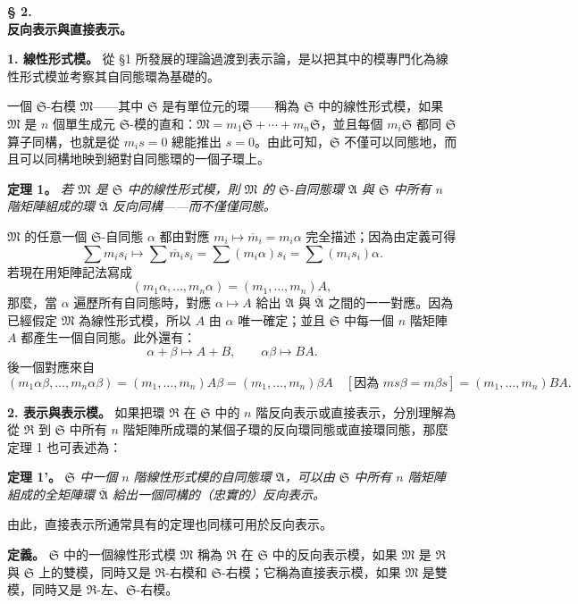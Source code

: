 \documentclass[11pt]{article}
\providecommand{\frR}{\mathfrak R}
\providecommand{\frS}{\mathfrak S}
\providecommand{\frM}{\mathfrak M}
\providecommand{\mA}{\mathfrak A}
\providecommand{\mbarA}{\overline{\mathfrak A}}
\begin{document}
\begin{center}
\textbf{§ 2.}\\[0.4em]
\textbf{反向表示與直接表示。}
\end{center}

\noindent\textbf{1. 線性形式模。} 從 §1 所發展的理論過渡到表示論，是以把其中的模專門化為線性形式模並考察其自同態環為基礎的。

一個 \(\frS\)-右模 \(\frM\)——其中 \(\frS\) 是有單位元的環——稱為 \(\frS\) 中的線性形式模，如果 \(\frM\) 是 \(n\) 個單生成元 \(\frS\)-模的直和：\(\frM=m_1\frS+\cdots+m_n\frS\)，並且每個 \(m_i\frS\) 都同 \(\frS\) 算子同構，也就是從 \(m_i s=0\) 總能推出 \(s=0\)。由此可知，\(\frS\) 不僅可以同態地，而且可以同構地映到絕對自同態環的一個子環上。

\noindent\textbf{定理 1。} \emph{若 \(\frM\) 是 \(\frS\) 中的線性形式模，則 \(\frM\) 的 \(\frS\)-自同態環 \(\mA\) 與 \(\frS\) 中所有 \(n\) 階矩陣組成的環 \(\mbarA\) 反向同構——而不僅僅同態。}

\(\frM\) 的任意一個 \(\frS\)-自同態 \(\alpha\) 都由對應 \(m_i\longmapsto \overline m_i=m_i\alpha\) 完全描述；因為由定義可得
\[
        \sum m_i s_i\longmapsto
        \sum \overline m_i s_i
        =\sum (m_i\alpha)s_i
        =\sum (m_i s_i)\alpha.
\]
若現在用矩陣記法寫成
\[
        (m_1\alpha,\ldots,m_n\alpha)=(m_1,\ldots,m_n)A,
\]
那麼，當 \(\alpha\) 遍歷所有自同態時，對應 \(\alpha\mapsto A\) 給出 \(\mA\) 與 \(\mbarA\) 之間的一一對應。因為已經假定 \(\frM\) 為線性形式模，所以 \(A\) 由 \(\alpha\) 唯一確定；並且 \(\frS\) 中每一個 \(n\) 階矩陣 \(A\) 都產生一個自同態。此外還有：
\[
        \alpha+\beta\mapsto A+B,\qquad
        \alpha\beta\mapsto BA.
\]
後一個對應來自
\[
        (m_1\alpha\beta,\ldots,m_n\alpha\beta)
        =(m_1,\ldots,m_n)A\beta
        =(m_1,\ldots,m_n)\beta A
        \quad[\text{因為 }m s\beta=m\beta s]
        =(m_1,\ldots,m_n)BA.
\]

\noindent\textbf{2. 表示與表示模。} 如果把環 \(\frR\) 在 \(\frS\) 中的 \(n\) 階反向表示或直接表示，分別理解為從 \(\frR\) 到 \(\frS\) 中所有 \(n\) 階矩陣所成環的某個子環的反向環同態或直接環同態，那麼定理 1 也可表述為：

\noindent\textbf{定理 1'。} \emph{\(\frS\) 中一個 \(n\) 階線性形式模的自同態環 \(\mA\)，可以由 \(\frS\) 中所有 \(n\) 階矩陣組成的全矩陣環 \(\mbarA\) 給出一個同構的（忠實的）反向表示。}

由此，直接表示所通常具有的定理也同樣可用於反向表示。

\noindent\textbf{定義。} \(\frS\) 中的一個線性形式模 \(\frM\) 稱為 \(\frR\) 在 \(\frS\) 中的反向表示模，如果 \(\frM\) 是 \(\frR\) 與 \(\frS\) 上的雙模，同時又是 \(\frR\)-右模和 \(\frS\)-右模；它稱為直接表示模，如果 \(\frM\) 是雙模，同時又是 \(\frR\)-左、\(\frS\)-右模。
\end{document}
